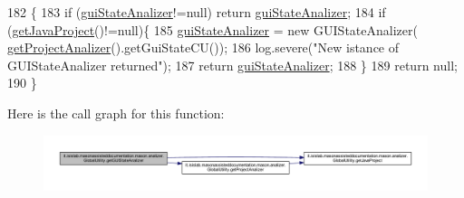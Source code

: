 \begin{DoxyCode}
182                                                         \{
183         \textcolor{keywordflow}{if} (\hyperlink{classit_1_1isislab_1_1masonassisteddocumentation_1_1mason_1_1analizer_1_1_global_utility_a21d75c0d0c0cf2c10af5c0549175d5a0}{guiStateAnalizer}!=null) \textcolor{keywordflow}{return} \hyperlink{classit_1_1isislab_1_1masonassisteddocumentation_1_1mason_1_1analizer_1_1_global_utility_a21d75c0d0c0cf2c10af5c0549175d5a0}{guiStateAnalizer};
184         \textcolor{keywordflow}{if} (\hyperlink{classit_1_1isislab_1_1masonassisteddocumentation_1_1mason_1_1analizer_1_1_global_utility_ab1fa2a5ac258d0119ca7d486261c01fb}{getJavaProject}()!=null)\{
185             \hyperlink{classit_1_1isislab_1_1masonassisteddocumentation_1_1mason_1_1analizer_1_1_global_utility_a21d75c0d0c0cf2c10af5c0549175d5a0}{guiStateAnalizer} = \textcolor{keyword}{new} GUIStateAnalizer(
      \hyperlink{classit_1_1isislab_1_1masonassisteddocumentation_1_1mason_1_1analizer_1_1_global_utility_a78cbdc6022c558d1375a01095ad95659}{getProjectAnalizer}().getGuiStateCU());        
186             log.severe(\textcolor{stringliteral}{"New istance of GUIStateAnalizer returned"});
187             \textcolor{keywordflow}{return} \hyperlink{classit_1_1isislab_1_1masonassisteddocumentation_1_1mason_1_1analizer_1_1_global_utility_a21d75c0d0c0cf2c10af5c0549175d5a0}{guiStateAnalizer};
188         \}
189         \textcolor{keywordflow}{return} null;
190     \}
\end{DoxyCode}


Here is the call graph for this function\-:\nopagebreak
\begin{figure}[H]
\begin{center}
\leavevmode
\includegraphics[width=350pt]{classit_1_1isislab_1_1masonassisteddocumentation_1_1mason_1_1analizer_1_1_global_utility_a360598554ec1ca25ec7d4b78679b5bcd_cgraph}
\end{center}
\end{figure}


